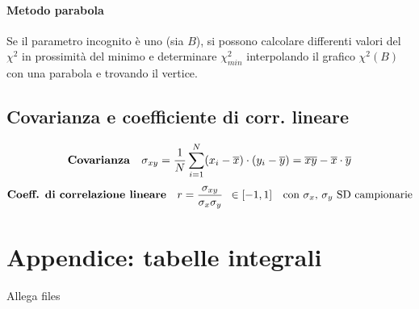 \documentclass[11pt]{article}
\begin{document}
\paragraph{Metodo parabola} Se il parametro incognito è uno (sia $B$), si possono calcolare differenti valori del $\chi^2$ in prossimità del minimo e determinare $\chi^2_{min}$ interpolando il grafico $\chi^2(B)$ con una parabola e trovando il vertice.

\subsection{Covarianza e coefficiente di corr. lineare}
\[\textrm{\textbf{Covarianza}} \quad \sigma_{xy} = \frac{1}{N}\sum \limits_{i = 1}^{N}(x_i - \overline{x})\cdot(y_i - \overline{y}) = \overline{xy} - \overline{x} \cdot \overline{y}\]
\[\textrm{\textbf{Coeff. di correlazione lineare}} \quad r = \frac{\sigma_{xy}}{\sigma_x\sigma_y} \enspace \in [-1, 1]\quad \textrm{con $\sigma_x$, $\sigma_y$ SD campionarie}\]

\section*{Appendice: tabelle integrali}

Allega files
\end{document}
